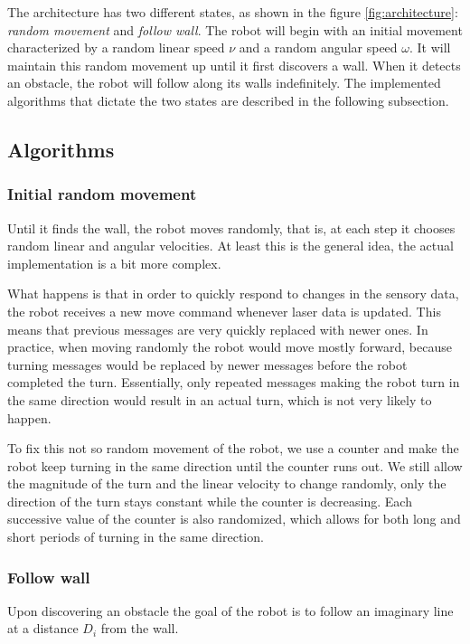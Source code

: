 \documentclass[10pt,journal,compsoc]{IEEEtran}
\begin{document}
The architecture has two different states, as shown in the figure \ref{fig:architecture}: \textit{random movement} and \textit{follow wall}. The robot will begin with an initial movement characterized by a random linear speed $\nu$ and a random angular speed $\omega$. It will maintain this random movement up until it first discovers a wall. When it detects an obstacle, the robot will follow along its walls indefinitely. The implemented algorithms that dictate the two states are described in the following subsection. 


\subsection{Algorithms}
\subsubsection{Initial random movement}\label{subsec:initial}

Until it finds the wall, the robot moves randomly, that is, at each step it chooses random linear and angular velocities. At least this is the general idea, the actual implementation is a bit more complex. 

What happens is that in order to quickly respond to changes in the sensory data, the robot receives a new move command whenever laser data is updated. This means that previous messages are very quickly replaced with newer ones. In practice, when moving randomly the robot would move mostly forward, because turning messages would be replaced by newer messages before the robot completed the turn. Essentially, only repeated messages making the robot turn in the same direction would result in an actual turn, which is not very likely to happen.

To fix this not so random movement of the robot, we use a counter and make the robot keep turning in the same direction until the counter runs out. We still allow the magnitude of the turn and the linear velocity to change randomly, only the direction of the turn stays constant while the counter is decreasing. Each successive value of the counter is also randomized, which allows for both long and short periods of turning in the same direction.

\subsubsection{Follow wall}
Upon discovering an obstacle the goal of the robot is to follow an imaginary line at a distance $D_i$ from the wall. 
\end{document}
